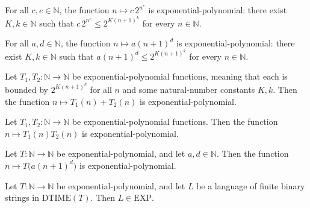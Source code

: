 \begin{theorem}
\label{Complexity.expPoly_exp}
\leanok
{}
For all $c,e\in\mathbb{N}$, the function $n\mapsto c\,2^{n^e}$ is
exponential-polynomial: there exist $K,k\in\mathbb{N}$ such that $c\,2^{n^e}\le
2^{K(n+1)^k}$ for every $n\in\mathbb{N}$.
\end{theorem}

\begin{theorem}
\label{Complexity.expPoly_poly}
\leanok
{}
For all $a,d\in\mathbb{N}$, the function $n\mapsto a(n+1)^d$ is exponential-polynomial:
there exist $K,k\in\mathbb{N}$ such that $a(n+1)^d\le 2^{K(n+1)^k}$ for every
$n\in\mathbb{N}$.
\end{theorem}

\begin{theorem}
\label{Complexity.ExpPoly.add}
\leanok
{}
Let $T_1,T_2:\mathbb{N}\to\mathbb{N}$ be exponential-polynomial functions, meaning that
each is bounded by $2^{K(n+1)^k}$ for all $n$ and some natural-number constants $K,k$.
Then the function $n\mapsto T_1(n)+T_2(n)$ is exponential-polynomial.
\end{theorem}

\begin{theorem}
\label{Complexity.ExpPoly.mul}
\leanok
{}
Let $T_1,T_2:\mathbb{N}\to\mathbb{N}$ be exponential-polynomial functions. Then the
function $n\mapsto T_1(n)T_2(n)$ is exponential-polynomial.
\end{theorem}

\begin{theorem}
\label{Complexity.ExpPoly.comp_poly}
\leanok
{}
Let $T:\mathbb{N}\to\mathbb{N}$ be exponential-polynomial, and let $a,d\in\mathbb{N}$.
Then the function $n\mapsto T\bigl(a(n+1)^d\bigr)$ is exponential-polynomial.
\end{theorem}

\begin{theorem}
\label{Complexity.ExpPoly.mem_EXP}
\leanok
{}
Let $T:\mathbb{N}\to\mathbb{N}$ be exponential-polynomial, and let $L$ be a language of
finite binary strings in $\mathrm{DTIME}(T)$. Then $L\in\mathrm{EXP}$.
\end{theorem}
